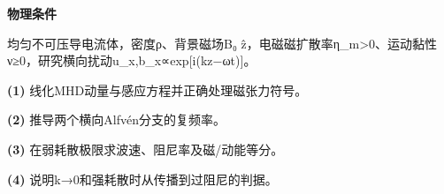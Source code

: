 \textbf{物理条件}\par 均匀不可压导电流体，密度ρ、背景磁场B₀ ẑ，电磁磁扩散率η\_m>0、运动黏性ν≥0，研究横向扰动u\_x,b\_x∝exp[i(kz−ωt)]。
\par\noindent\textbf{(1)} 线化MHD动量与感应方程并正确处理磁张力符号。
\par\noindent\textbf{(2)} 推导两个横向Alfvén分支的复频率。
\par\noindent\textbf{(3)} 在弱耗散极限求波速、阻尼率及磁/动能等分。
\par\noindent\textbf{(4)} 说明k→0和强耗散时从传播到过阻尼的判据。
